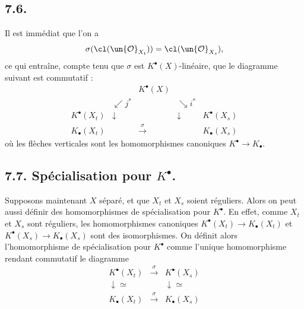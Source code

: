 \subsection*{7.6.}

Il est imm\'ediat que l'on a
\begin{equation}\label{eq:7.6.1}
\sigma(\cl(\un{\mathcal{O}}_{X_{t}})) = \cl(\un{\mathcal{O}}_{X_{s}}),
\end{equation}
ce qui entra\^ine, compte tenu que $\sigma$ est $K^{\bullet}(X)$-lin\'eaire, que le diagramme suivant est commutatif :
\begin{equation}\label{eq:7.6.2}
\begin{array}{ccccc}
& & K^{\bullet}(X) & & \\
& \swarrow{\scriptstyle j^{*}} & & \searrow{\scriptstyle i^{*}} & \\
K^{\bullet}(X_{t}) & \downarrow & & \downarrow & K^{\bullet}(X_{s}) \\
K_{\bullet}(X_{t}) & & \xrightarrow{\,\sigma\,} & & K_{\bullet}(X_{s})
\end{array}
\end{equation}
o\`u les fl\`eches verticales sont les homomorphismes canoniques $K^{\bullet} \to K_{\bullet}$.

\subsection*{7.7. Sp\'ecialisation pour $K^{\bullet}$.}

Supposons maintenant $X$ s\'epar\'e, et que $X_{t}$ et $X_{s}$ soient r\'eguliers. Alors on peut aussi d\'efinir des homomorphismes de sp\'ecialisation pour $K^{\bullet}$. En effet, comme $X_{t}$ et $X_{s}$ sont r\'eguliers, les homomorphismes canoniques $K^{\bullet}(X_{t}) \to K_{\bullet}(X_{t})$ et $K^{\bullet}(X_{s}) \to K_{\bullet}(X_{s})$ sont des isomorphismes. On d\'efinit alors l'homomorphisme de sp\'ecialisation pour $K^{\bullet}$ comme l'unique homomorphisme rendant commutatif le diagramme
\begin{equation}\label{eq:7.7.1}
\begin{array}{ccc}
K^{\bullet}(X_{t}) & \xrightarrow{\,\sigma\,} & K^{\bullet}(X_{s}) \\
\downarrow{\scriptstyle \simeq} & & \downarrow{\scriptstyle \simeq} \\
K_{\bullet}(X_{t}) & \xrightarrow{\,\sigma\,} & K_{\bullet}(X_{s})
\end{array}
\end{equation}

